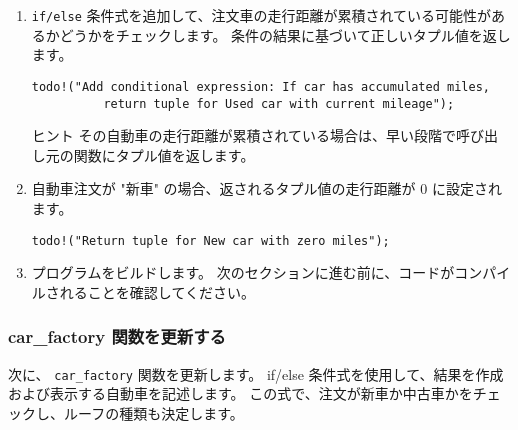 \begin{enumerate}

\item \texttt{if/else} 条件式を追加して、注文車の走行距離が累積されている可能性があるかどうかをチェックします。 条件の結果に基づいて正しいタプル値を返します。

\begin{lstlisting}[numbers=none]
   todo!("Add conditional expression: If car has accumulated miles,
          return tuple for Used car with current mileage");
\end{lstlisting}

\begin{itembox}[l]{ヒント}
その自動車の走行距離が累積されている場合は、早い段階で呼び出し元の関数にタプル値を返します。
\end{itembox}

\item 自動車注文が "新車" の場合、返されるタプル値の走行距離が 0 に設定されます。
\begin{lstlisting}[numbers=none]
    todo!("Return tuple for New car with zero miles");
\end{lstlisting}

\item プログラムをビルドします。 次のセクションに進む前に、コードがコンパイルされることを確認してください。

\end{enumerate}

\subsubsection{car\_factory 関数を更新する}

次に、 \texttt{car\_factory} 関数を更新します。 if/else 条件式を使用して、結果を作成および表示する自動車を記述します。 この式で、注文が新車か中古車かをチェックし、ルーフの種類も決定します。

